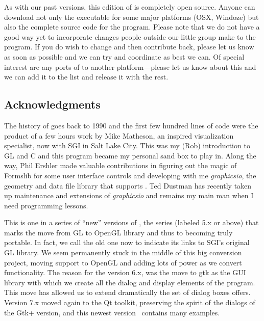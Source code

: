 As with our past versions, this edition of \map{} is completely open
source.  Anyone can download not only the executable for some major
platforms (OSX, Windoze) but also the complete source code for
the program.  Please note that we do not have a good way yet to incorporate
changes people outside our little group make to the program.  If you do
wish to change and then contribute back, please let us know as soon as
possible and we can try and coordinate as best we can.  Of special interest
are any ports of \map{} to another platform---please let us know about this
and we can add it to the list and release it with the rest.

\subsection{Acknowledgments}

The history of \map{} goes back to 1990 and the first few hundred lines of
code were the product of a few hours work by Mike Matheson, an inspired
visualization specialist, now with SGI in Salt Lake City.  This was my
(Rob) introduction to GL and C and this program became my personal sand box
to play in.  Along the way, Phil Ershler made valuable contributions in
figuring out the magic of Formslib for some user interface controls and
developing with me \emph{graphicsio}, the geometry and data file library
that supports \map{}.  Ted Dustman has recently taken up maintenance and
extensions of \emph{graphicsio} and remains my main man when I need
programming lessons.

This is one in a series of ``new'' versions of \map{}, the series (labeled
5.x or above) that marks the move from GL to OpenGL library and thus to
becoming truly portable.  In fact, we call the old one \mapgl{} now to
indicate its links to SGI's original GL library.  We seem permanently stuck
in the middle of this big conversion project, moving support to OpenGL and
adding lots of power as we convert functionality.  The reason for the
version 6.x, was the move to gtk as the GUI library with which we create
all the dialog and display elements of the program.  This move has allowed
us to extend dramatically the set of dialog boxes \map{} offers. 
Version 7.x moved again to the Qt toolkit, preserving the spirit of the dialogs of the Gtk+ version, and this
newest version~\version{} contains many examples.

